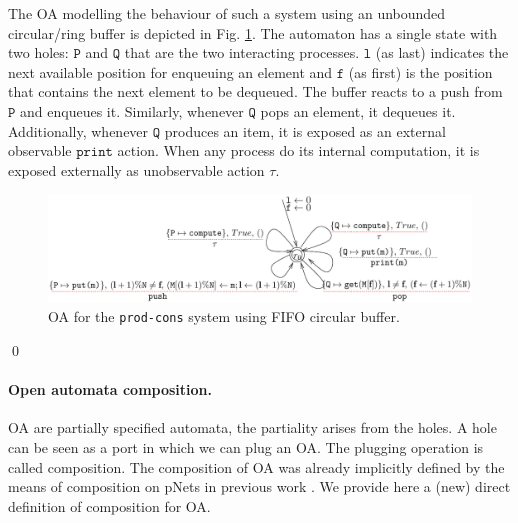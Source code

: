 \documentclass[runningheads]{llncs}
\begin{document}
\begin{example}
The OA  modelling the behaviour of such a system  using an  unbounded circular/ring buffer is depicted in Fig. \ref{Fig:RefineOA}.  The automaton has a single state with  two holes: $\texttt{P}$ and  $\texttt{Q}$ that are the two interacting processes.  $\texttt{l}$ (as last)  indicates the next available position for  enqueuing an element  and  $\texttt{f}$ (as first) is the position that contains the next element to be dequeued. %
The buffer reacts to a push from $\texttt{P}$ and enqueues it. Similarly, whenever   $\texttt{Q}$ pops an element, it dequeues it. Additionally, whenever $\texttt{Q}$ produces an item, it is exposed as an external observable  $\texttt{print}$ action. 
When any process do its internal computation, it is exposed externally as unobservable action $\tau$. 
\begin{figure}[!tb]
 \centering
   \includegraphics[width=.99\textwidth]{Figures/FIFORing.pdf}
   \caption{OA for the \texttt{prod-cons} system using FIFO circular buffer.
    \label{Fig:RefineOA}} 
\end{figure}
\qed
\end{example}





\paragraph{Open automata composition.}

OA are partially specified automata, the partiality arises  from the holes.
A hole can be seen as a port in which we can plug an OA.
The plugging operation is called composition.
The composition of OA was already implicitly defined by the means of composition on pNets in previous work \cite{henrio:01299562}. We provide here a (new) direct definition of composition for OA.
\end{document}

